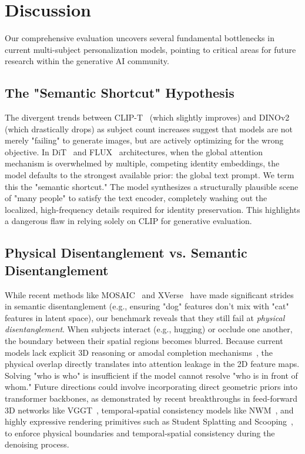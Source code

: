 \section{Discussion}

Our comprehensive evaluation uncovers several fundamental bottlenecks in current multi-subject personalization models, pointing to critical areas for future research within the generative AI community.

\subsection{The "Semantic Shortcut" Hypothesis}
The divergent trends between CLIP-T~\cite{radford2021learning} (which slightly improves) and DINOv2~\cite{oquab2023dinov2} (which drastically drops) as subject count increases suggest that models are not merely "failing" to generate images, but are actively optimizing for the wrong objective. In DiT~\cite{peebles2023scalable} and FLUX~\cite{flux2024} architectures, when the global attention mechanism is overwhelmed by multiple, competing identity embeddings, the model defaults to the strongest available prior: the global text prompt. We term this the "semantic shortcut." The model synthesizes a structurally plausible scene of "many people" to satisfy the text encoder, completely washing out the localized, high-frequency details required for identity preservation. This highlights a dangerous flaw in relying solely on CLIP for generative evaluation.

\subsection{Physical Disentanglement vs. Semantic Disentanglement}
While recent methods like MOSAIC~\cite{mosaic2024} and XVerse~\cite{xverse2024} have made significant strides in semantic disentanglement (e.g., ensuring "dog" features don't mix with "cat" features in latent space), our benchmark reveals that they still fail at \textit{physical disentanglement}. When subjects interact (e.g., hugging) or occlude one another, the boundary between their spatial regions becomes blurred. Because current models lack explicit 3D reasoning or amodal completion mechanisms~\cite{seethrough3d2024}, the physical overlap directly translates into attention leakage in the 2D feature maps. Solving "who is who" is insufficient if the model cannot resolve "who is in front of whom." Future directions could involve incorporating direct geometric priors into transformer backbones, as demonstrated by recent breakthroughs in feed-forward 3D networks like VGGT~\cite{chen2025vggt}, temporal-spatial consistency models like NWM~\cite{bar2024navigation}, and highly expressive rendering primitives such as Student Splatting and Scooping~\cite{zhu2025student}, to enforce physical boundaries and temporal-spatial consistency during the denoising process.

